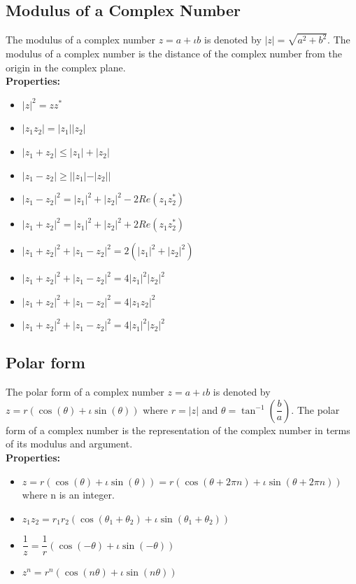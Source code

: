 \documentclass[12pt, oneside]{book}
\theoremstyle{definition}
\theoremstyle{definition}
\theoremstyle{remark}
\begin{document}
\subsection{Modulus of a Complex Number}
The modulus of a complex number $z=a+\iota b$ is denoted by $|z|=\sqrt{a^2+b^2}$. The modulus of a complex number is the distance of the complex number from the origin in the complex plane.\\
\textbf{Properties: }
\begin{itemize}
    \item $|z|^2=zz^*$
    \item $|z_1z_2|=|z_1||z_2|$
    \item $|z_1+z_2|\leq |z_1|+|z_2|$
    \item $|z_1-z_2|\geq ||z_1|-|z_2||$
    \item $|z_1-z_2|^2=|z_1|^2+|z_2|^2-2Re(z_1z_2^*)$
    \item $|z_1+z_2|^2=|z_1|^2+|z_2|^2+2Re(z_1z_2^*)$
    \item $|z_1+z_2|^2+|z_1-z_2|^2=2(|z_1|^2+|z_2|^2)$
    \item $|z_1+z_2|^2+|z_1-z_2|^2=4|z_1|^2|z_2|^2$
    \item $|z_1+z_2|^2+|z_1-z_2|^2=4|z_1z_2|^2$
    \item $|z_1+z_2|^2+|z_1-z_2|^2=4|z_1|^2|z_2|^2$
\end{itemize}

\subsection{Polar form}
The polar form of a complex number $z=a+\iota b$ is denoted by $z=r(\cos(\theta)+\iota \sin(\theta))$ where $r=|z|$ and $\theta=\tan^{-1}(\dfrac{b}{a})$. The polar form of a complex number is the representation of the complex number in terms of its modulus and argument.\\
\textbf{Properties: }
\begin{itemize}
    \item $z=r(\cos(\theta)+\iota \sin(\theta))=r(\cos(\theta+2\pi n)+\iota \sin(\theta+2\pi n))$ where n is an integer.
    \item $z_1z_2=r_1r_2(\cos(\theta_1+\theta_2)+\iota \sin(\theta_1+\theta_2))$
    \item $\dfrac{1}{z}=\dfrac{1}{r}(\cos(-\theta)+\iota \sin(-\theta))$
    \item $z^n=r^n(\cos(n\theta)+\iota \sin(n\theta))$
\end{itemize}
\end{document}
